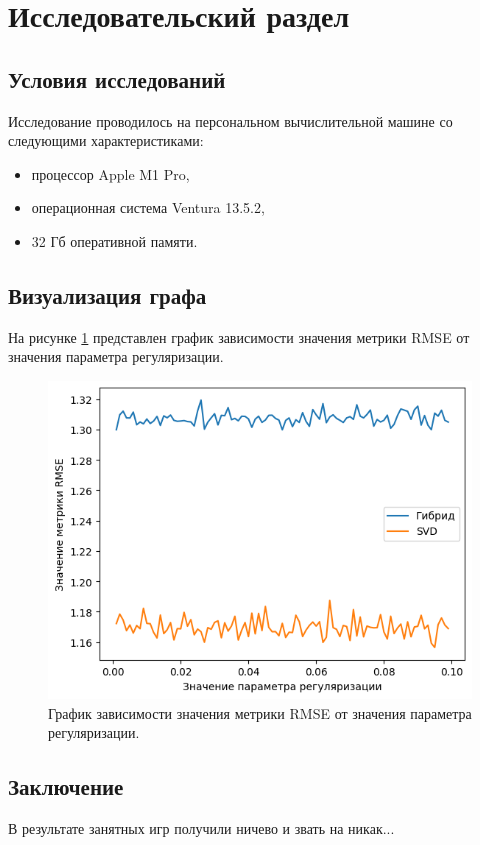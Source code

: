 \section{Исследовательский раздел}
\subsection{Условия исследований}
Исследование проводилось на персональном вычислительной машине со следующими характеристиками:

\begin{itemize}
\item процессор Apple M1 Pro,
\item операционная система Ventura 13.5.2,
\item 32 Гб оперативной памяти.
\end{itemize}

\subsection{Визуализация графа}

На рисунке \ref{img:1} представлен график зависимости значения метрики RMSE от значения параметра регуляризации.

\begin{figure}[H]
	\centering
	\includegraphics[width=\textwidth]{inc/1.png}
	\caption{ График зависимости значения метрики RMSE от значения параметра регуляризации.}
	\label{img:1}
\end{figure}

\subsection*{Заключение}

В результате занятных игр получили ничево и звать на никак...
